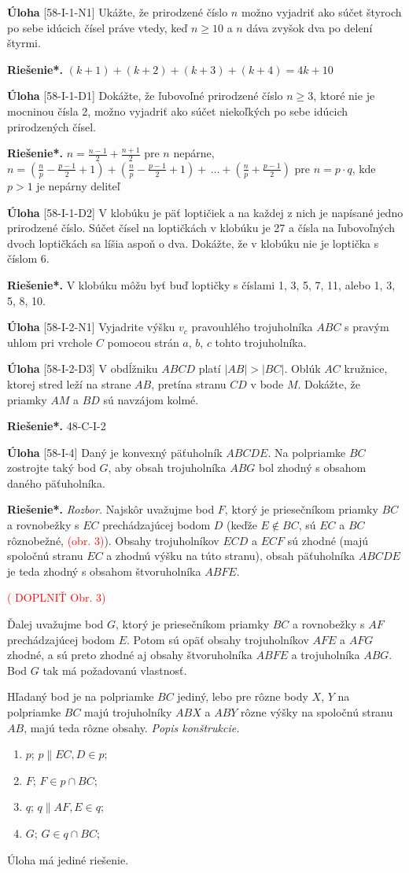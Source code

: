 \documentclass{article}
\newcommand{\rieh}{\textbf{Riešenie*.} }
\newcommand\todo[1]{\noindent\textcolor{red}{(#1)}}
\newcommand{\problem}[4]{
  \begin{tcolorbox}[breakable,notitle,boxrule=0pt,colback=light-gray,colframe=light-gray]
    \textbf{Úloha}
    [#1] #3
  \end{tcolorbox}
  \noindent#4
}
\begin{document}
\problem{58-I-1-N1}{}{
Ukážte, že prirodzené číslo $n$ možno vyjadriť ako súčet štyroch po sebe idúcich čísel práve vtedy, keď $n \geq 10$ a $n$ dáva zvyšok dva po delení štyrmi.
}{
\rieh $(k + 1) + (k + 2) + (k + 3) + (k + 4) = 4k + 10$
}


\problem{58-I-1-D1}{}{
Dokážte, že ľubovoľné prirodzené číslo $n \geq 3$, ktoré nie je mocninou čísla 2, možno
vyjadriť ako súčet niekoľkých po sebe idúcich prirodzených čísel.
}{
\rieh $n = \frac{n-1}{2}+ \frac{n+1}{2}$ pre
$n$ nepárne, $n = ( \frac{n}{p}-\frac{p-1}{2}+1)+(\frac{n}{p}-\frac{p-1}{2}+ 1) +\,\ldots + ( \frac{n}{p}+\frac{p-1}{2})$ pre $n = p\cdot q$, kde $p > 1$ je nepárny deliteľ
}


\problem{58-I-1-D2}{}{
V klobúku je päť loptičiek a na každej z nich je napísané jedno prirodzené číslo. Súčet
čísel na loptičkách v klobúku je 27 a čísla na ľubovoľných dvoch loptičkách sa líšia
aspoň o dva. Dokážte, že v klobúku nie je loptička s číslom 6.
}{
\rieh V klobúku môžu byť buď loptičky s číslami 1, 3, 5, 7, 11, alebo 1, 3, 5, 8, 10.
}

\problem{58-I-2-N1}{}{
Vyjadrite výšku $v_c$ pravouhlého trojuholníka $ABC$ s pravým uhlom pri vrchole $C$
pomocou strán $a$, $b$, $c$ tohto trojuholníka.
}{
}

\problem{58-I-2-D3}{}{
V obdĺžniku $ABCD$ platí $|AB| > |BC|$. Oblúk $AC$ kružnice, ktorej stred leží na strane $AB$, pretína stranu $CD$ v bode $M$. Dokážte, že priamky $AM$ a $BD$ sú navzájom
kolmé.
}{
\rieh 48-C-I-2
}


\problem{58-I-4}{}{
Daný je konvexný päťuholník $ABCDE$. Na polpriamke $BC$ zostrojte taký bod $G$, aby
obsah trojuholníka $ABG$ bol zhodný s obsahom daného päťuholníka.
}{
\rieh \textit{Rozbor.} Najskôr uvažujme bod $F$, ktorý je priesečníkom priamky $BC$ a rovnobežky s $EC$ prechádzajúcej bodom $D$ (keďže $E\notin BC$, sú $EC$ a $BC$ rôznobežné, \todo{obr. 3}). Obsahy trojuholníkov $ECD$ a $ECF$ sú zhodné (majú spoločnú stranu $EC$ a zhodnú výšku na túto stranu), obsah päťuholníka $ABCDE$ je teda zhodný s obsahom štvoruholníka $ABFE$.

\todo{ DOPLNIŤ Obr. 3}

Ďalej uvažujme bod $G$, ktorý je priesečníkom priamky $BC$ a rovnobežky s $AF$
prechádzajúcej bodom $E$. Potom sú opäť obsahy trojuholníkov $AFE$ a $AFG$ zhodné, a sú preto zhodné aj obsahy štvoruholníka $ABFE$ a trojuholníka $ABG$. Bod $G$ tak má
požadovanú vlastnosť.

Hľadaný bod je na polpriamke $BC$ jediný, lebo pre rôzne body $X$, $Y$ na polpriamke $BC$ majú trojuholníky $ABX$ a $ABY$ rôzne výšky na spoločnú stranu $AB$, majú teda rôzne obsahy.
\textit{Popis konštrukcie.}
\begin{enumerate}
    \item $p$; $p \parallel EC, D \in p$;
    \item $F$; $F \in p \cap BC$;
    \item $q$; $q \parallel AF, E \in q$;
    \item $G$; $G \in q \cap BC$;
\end{enumerate}

Úloha má jediné riešenie.
}
\end{document}
